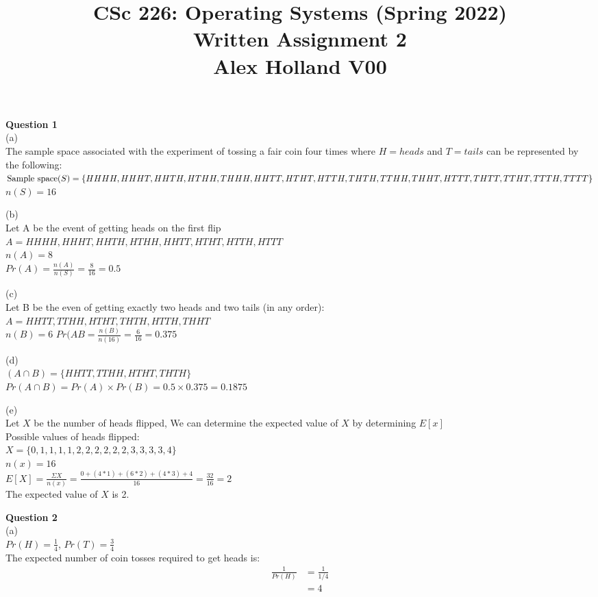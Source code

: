 \documentclass{article}
\title{%
   CSc 226: Operating Systems (Spring 2022) \\
   \large Written Assignment 2\\
    Alex Holland V00}
\date{}
\begin{document}
\maketitle

{\bf Question 1}\\
(a)\\
The sample space associated with the experiment of tossing a fair coin four times where $H=heads$ and $T=tails$ can be represented by the following:\\
$\text{Sample space} (S) = \{HHHH, HHHT, HHTH, HTHH, THHH, HHTT, HTHT,\\ 
HTTH ,THTH, TTHH, THHT, HTTT, THTT, TTHT, TTTH, TTTT\}$\\
$n(S) = 16$

\bigskip
(b)\\
Let A be the event of getting heads on the first flip\\
$A={HHHH, HHHT, HHTH, HTHH, HHTT, HTHT, HTTH, HTTT}$\\
$n(A) = 8$\\
$Pr(A)=\frac{n(A)}{n(S)}=\frac{8}{16}=0.5$

\bigskip
(c)\\
Let B be the even of getting exactly two heads and two tails (in any order):\\
$A={HHTT, TTHH, HTHT, THTH, HTTH, THHT}$\\
$n(B)=6$
$Pr(AB=\frac{n(B)}{n(16)}=\frac{6}{16}=0.375$

\bigskip
(d)\\
$(A \cap B) = \{HHTT, TTHH, HTHT, THTH\}$\\
$Pr(A \cap B) = Pr(A) \times Pr(B) = 0.5 \times 0.375 = 0.1875$


\bigskip
(e)\\
Let $X$ be the number of heads flipped, We can determine the expected value of $X$ by determining $E[x]$\\
Possible values of heads flipped:\\
$X=\{0,1,1,1,1,2,2,2,2,2,2,3,3,3,3,4\}$\\
$n(x) = 16$\\
$E[X] = \frac{\Sigma X}{n(x)}=\frac{0+(4*1)+(6*2)+(4*3)+4}{16}=\frac{32}{16}=2$\\
The expected value of $X$ is 2.

\bigskip
{\bf Question 2}\\
(a)\\
$Pr(H) = \frac{1}{4}$, $Pr(T) = \frac{3}{4}$\\
The expected number of coin tosses required to get heads is:
\begin{equation*} 
\begin{split}
    \frac{1}{Pr(H)} &= \frac{1}{1/4}\\
    &= 4\\
\end{split}
\end{equation*} 
\end{document}
